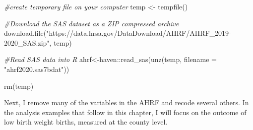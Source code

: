\documentclass[
]{article}
\newenvironment{Shaded}{\begin{snugshade}}{\end{snugshade}}
\newcommand{\AttributeTok}[1]{\textcolor[rgb]{0.77,0.63,0.00}{#1}}
\newcommand{\CommentTok}[1]{\textcolor[rgb]{0.56,0.35,0.01}{\textit{#1}}}
\newcommand{\FunctionTok}[1]{\textcolor[rgb]{0.00,0.00,0.00}{#1}}
\newcommand{\NormalTok}[1]{#1}
\newcommand{\OtherTok}[1]{\textcolor[rgb]{0.56,0.35,0.01}{#1}}
\newcommand{\SpecialCharTok}[1]{\textcolor[rgb]{0.00,0.00,0.00}{#1}}
\newcommand{\StringTok}[1]{\textcolor[rgb]{0.31,0.60,0.02}{#1}}
\begin{document}
\begin{Shaded}
\begin{Highlighting}[]
\CommentTok{\#create temporary file on  your computer}
\NormalTok{temp }\OtherTok{\textless{}{-}} \FunctionTok{tempfile}\NormalTok{()}

\CommentTok{\#Download the SAS dataset as a ZIP compressed archive}
\FunctionTok{download.file}\NormalTok{(}\StringTok{"https://data.hrsa.gov/DataDownload/AHRF/AHRF\_2019{-}2020\_SAS.zip"}\NormalTok{, temp)}

\CommentTok{\#Read SAS data into R}
\NormalTok{ahrf}\OtherTok{\textless{}{-}}\NormalTok{haven}\SpecialCharTok{::}\FunctionTok{read\_sas}\NormalTok{(}\FunctionTok{unz}\NormalTok{(temp,}
                          \AttributeTok{filename =} \StringTok{"ahrf2020.sas7bdat"}\NormalTok{))}

\FunctionTok{rm}\NormalTok{(temp)}
\end{Highlighting}
\end{Shaded}

Next, I remove many of the variables in the AHRF and recode several others. In the analysis examples that follow in this chapter, I will focus on the outcome of low birth weight births, measured at the county level.
\end{document}
